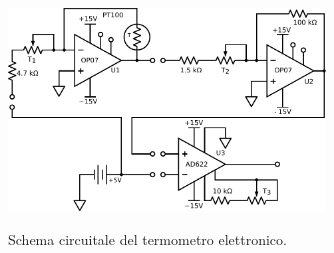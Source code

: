 \begin{figure}[ht]
 \centering
   {\includegraphics[width=0.75\textwidth]{../E06/latex/c1.pdf}}
 \caption{Schema circuitale del termometro elettronico.}
 \label{gr6:sbil_amp_diff}
\end{figure}
